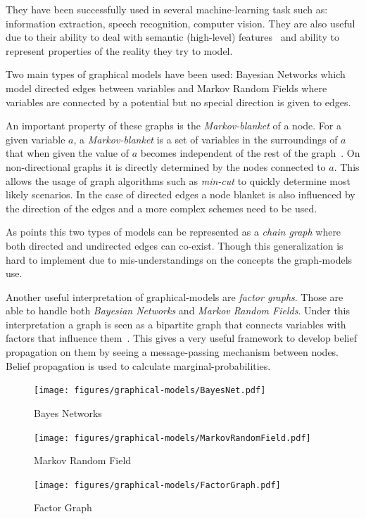 They have been successfully used in several machine-learning task such as:
information extraction, speech recognition, computer vision.
They are also useful due to their ability to deal with semantic (high-level)
features~\citep{boutell2006factor} and ability to represent properties of the
reality they try to model.

Two main types of graphical models have been used: Bayesian Networks which model
directed edges between variables and Markov Random Fields where variables are
connected by a potential but no special direction is given to edges.

An important property of these graphs is the \emph{Markov-blanket} of a node.
For a given variable $a$, a \emph{Markov-blanket} is a set of variables in the
surroundings of $a$ that when given the value of $a$ becomes independent of the
rest of the graph~\citep{pearl1988probabilistic}.
On non-directional graphs it is directly determined by the nodes connected to $a$.
This allows the usage of graph algorithms such as \emph{min-cut} to quickly
determine most likely scenarios. In the case of directed edges a node blanket is
also influenced by the direction of the edges and a more complex schemes need to
be used.

As \cite{lauritzen2002chain} points this two types of models can be represented
as a \emph{chain graph} where both directed and undirected edges can co-exist.
Though this generalization is hard to implement due to mis-understandings on the
concepts the graph-models use.

Another useful interpretation of graphical-models are \emph{factor graphs}.
Those are able to handle both \emph{Bayesian Networks} and
\emph{Markov Random Fields}. Under this interpretation a graph is seen as a
bipartite graph that connects variables with factors that influence
them~\citep{bishop2006pattern}.
This gives a very useful framework to develop belief propagation on them by
seeing a message-passing mechanism between nodes. Belief propagation is used to
calculate marginal-probabilities.

\begin{figure}[ht]
    \begin{minipage}[b]{0.3\linewidth}
        \centering
        \texttt{[image: figures/graphical-models/BayesNet.pdf]}
        \caption{Bayes Networks}
    \end{minipage}
    \hspace{0.5cm}
    \begin{minipage}[b]{0.3\linewidth}
        \centering
        \texttt{[image: figures/graphical-models/MarkovRandomField.pdf]}
        \caption{Markov Random Field}
    \end{minipage}
    \hspace{0.5cm}
    \begin{minipage}[b]{0.3\linewidth}
        \centering
        \texttt{[image: figures/graphical-models/FactorGraph.pdf]}
        \caption{Factor Graph}
    \end{minipage}
\end{figure}

